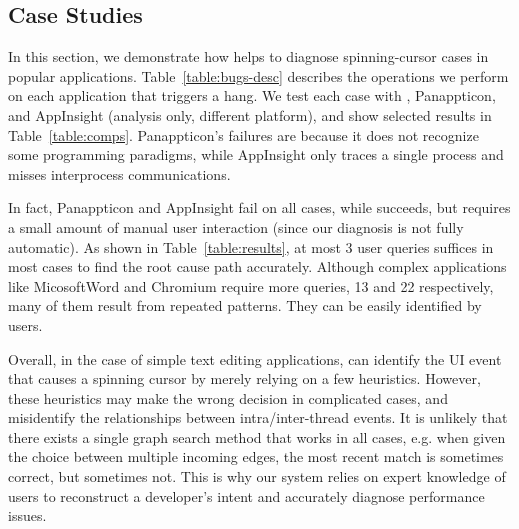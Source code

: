 \subsection{Case Studies}\label{sec:casestudy}

In this section, we demonstrate how \xxx helps to diagnose \nbug
spinning-cursor cases in popular applications. Table~\ref{table:bugs-desc}
describes the operations we perform on each application that triggers a hang.
We test each case with \xxx, Panappticon, and AppInsight (analysis only, different platform),
and show selected results in Table~\ref{table:comps}.
Panappticon's failures are because it does not recognize some programming paradigms,
while AppInsight only traces a single process and misses interprocess communications. 

In fact, Panappticon and AppInsight fail on all cases, while \xxx succeeds, but
requires a small amount of manual user interaction (since our diagnosis is not
fully automatic). As shown in Table~\ref{table:results}, at most 3 user queries
suffices in most cases to find the root cause path accurately. Although complex
applications like MicosoftWord and Chromium require more queries, 13 and 22
respectively, many of them result from repeated patterns. They can be easily
identified by users.

Overall, in the case of simple text editing applications, \xxx can identify the
UI event that causes a spinning cursor by merely relying on a few heuristics.
However, these heuristics may make the wrong decision in complicated cases, and
misidentify the relationships between intra/inter-thread events. It is unlikely
that there exists a single graph search method that works in all cases, e.g.
when given the choice between multiple incoming edges, the most recent match is
sometimes correct, but sometimes not. This is why our system relies on expert
knowledge of users to reconstruct a developer's intent and accurately diagnose
performance issues.








